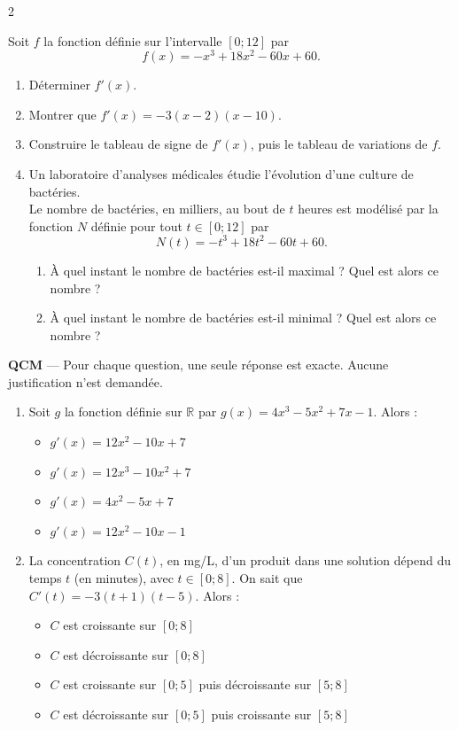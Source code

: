 \documentclass[10pt,a4paper]{article}
\begin{document}
\begin{multicols}{2}
\begin{exo}[][ccf]
\end{exo} 

\begin{exo}[][ccf]

Soit $f$ la fonction définie sur l'intervalle $[0;12]$ par 
\[ f(x) = -x^3+18x^2-60x+60. \]
\begin{enumerate}
\item Déterminer $f'(x)$.
\item Montrer que $f'(x) = -3(x-2)(x-10)$.
\item Construire le tableau de signe de $f'(x)$, puis le tableau de variations de $f$.
\item Un laboratoire d'analyses médicales étudie l'évolution d'une culture de bactéries.\\
Le nombre de bactéries, en milliers, au bout de $t$ heures est modélisé par la fonction $N$ définie pour tout $t \in [0;12]$ par
\[ N(t) = -t^3+18t^2-60t+60. \]
	\begin{enumerate}
	\item À quel instant le nombre de bactéries est-il maximal ? Quel est alors ce nombre ?
	\item À quel instant le nombre de bactéries est-il minimal ? Quel est alors ce nombre ?
	\end{enumerate}
\end{enumerate}

\end{exo}

\begin{exo}[][ccf]

\textbf{QCM} --- Pour chaque question, une seule réponse est exacte. Aucune justification n'est demandée.

\begin{enumerate}
\item Soit $g$ la fonction définie sur $\mathbb{R}$ par $g(x) = 4x^3-5x^2+7x-1$. Alors :
\begin{itemize}
\item[\textbf{A.}] $g'(x) = 12x^2-10x+7$
\item[\textbf{B.}] $g'(x) = 12x^3-10x^2+7$
\item[\textbf{C.}] $g'(x) = 4x^2-5x+7$
\item[\textbf{D.}] $g'(x) = 12x^2-10x-1$
\end{itemize}

\item La concentration $C(t)$, en mg/L, d'un produit dans une solution dépend du temps $t$ (en minutes), avec $t \in [0;8]$. On sait que $C'(t) = -3(t+1)(t-5)$. Alors :
\begin{itemize}
\item[\textbf{A.}] $C$ est croissante sur $[0;8]$
\item[\textbf{B.}] $C$ est décroissante sur $[0;8]$
\item[\textbf{C.}] $C$ est croissante sur $[0;5]$ puis décroissante sur $[5;8]$
\item[\textbf{D.}] $C$ est décroissante sur $[0;5]$ puis croissante sur $[5;8]$
\end{itemize}


\end{enumerate}
\end{exo}
\end{multicols}
\end{document}
